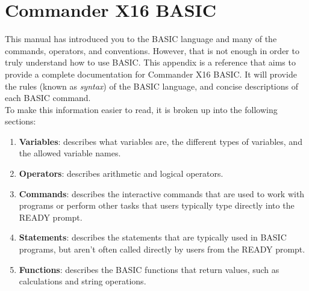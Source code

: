 \chapter*{Commander X16 BASIC}

This manual has introduced you to the BASIC language and many of the commands,
operators, and conventions.  However, that is not enough in order to truly
understand how to use BASIC.  This appendix is a reference that aims to provide
a complete documentation for Commander X16 BASIC.  It will provide the rules
(known as \emph{syntax}) of the BASIC language, and concise descriptions of
each BASIC command.\\

To make this information easier to read, it is broken up into the following
sections:\\

\begin{enumerate}

	\item {\bfseries Variables}: describes what variables are, the different
		types of variables, and the allowed variable names.

	\item {\bfseries Operators}: describes arithmetic and logical operators.

	\item {\bfseries Commands}: describes the interactive commands that are
		used to work with programs or perform other tasks that users typically
		type directly into the {\ttfamily READY} prompt.

	\item {\bfseries Statements}: describes the statements that are typically
		used in BASIC programs, but aren't often called directly by users from
		the {\ttfamily READY} prompt.

	\item {\bfseries Functions}: describes the BASIC functions that return
		values, such as calculations and string operations.

\end{enumerate}

\vspace{16pt}


